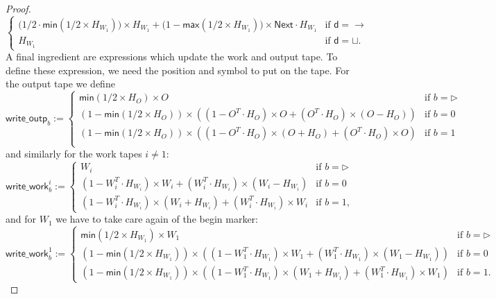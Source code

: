 \begin{proof}
$$\begin{cases}
            \bigl(1/2\cdot\mathsf{min}(1/2\times H_{W_1})\bigr)\times H_{W_1} + \bigl(1-\mathsf{max}(1/2\times H_{W_1})\bigr)\times \mathsf{Next}\cdot H_{W_1}  & \!\!\!\!\text{if $\mathsf{d}=\rightarrow$}\\
        H_{W_1} & \!\!\!\!\text{if $\mathsf{d}=\sqcup$}. 	
    \end{cases}
    $$
    A final ingredient are expressions which update the work and output tape.
    To define these expression, we need the position and symbol to put on the tape. For the output tape we define
    $$
    \mathsf{write\_outp}_b:=\begin{cases}
    \mathsf{min}(1/2\times H_O)\times O & \text{if $b=\rhd$}\\
    (1-\mathsf{min}(1/2\times H_O))\times\left((1-O^T\cdot H_O)\times O + (O^T\cdot H_O)\times (O-H_O)\right) &\text{if $b=0$}\\
    (1-\mathsf{min}(1/2\times H_O))\times\left((1-O^T\cdot H_O)\times (O+H_O) + (O^T\cdot H_O)\times O\right) &\text{if $b=1$}\\
    \end{cases}
    $$
    and similarly for the work tapes $i\neq 1$:
    $$
    \mathsf{write\_work}_b^i:=\begin{cases}
    W_i & \text{if $b=\rhd$}\\
    (1-W_i^T\cdot H_{W_i})\times W_i + (W_i^T\cdot H_{W_i})\times (W_i-H_{W_i}) &\text{if $b=0$}\\
    (1-W_i^T\cdot H_{W_i})\times (W_i+H_{W_i}) + (W_i^T\cdot H_{W_i})\times W_i &\text{if $b=1$},
    \end{cases}
    $$
    and for  $W_1$ we have to take care again of the begin marker:
    $$
    \mathsf{write\_work}_b^1:=\begin{cases}
    \mathsf{min}(1/2\times H_{W_1})\times W_1 & \text{if $b=\rhd$}\\
    (1-\mathsf{min}(1/2\times H_{W_1}))\times\left((1-W_1^T\cdot H_{W_1})\times W_1 + (W_1^T\cdot H_{W_1})\times (W_1-H_{W_1})\right) &\text{if $b=0$}\\
    (1-\mathsf{min}(1/2\times H_{W_1}))\times\left((1-W_1^T\cdot H_{W_1})\times (W_1+H_{W_1}) + (W_1^T\cdot H_{W_1})\times W_1\right) &\text{if $b=1$}.
    \end{cases}
    $$


\end{proof}
